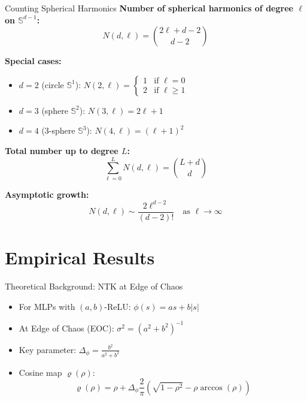 \documentclass{beamer}
\newcommand{\Sd}{\mathbb{S}^{d-1}}
\begin{document}
\begin{frame}{Counting Spherical Harmonics}
\textbf{Number of spherical harmonics of degree $\ell$ on $\Sd$:}
\[ N(d,\ell) = \binom{2\ell + d - 2}{d - 2} \]

\textbf{Special cases:}
\begin{itemize}
\item $d = 2$ (circle $\mathbb{S}^1$): $N(2,\ell) = \begin{cases} 1 & \text{if } \ell = 0 \\ 2 & \text{if } \ell \geq 1 \end{cases}$
\item $d = 3$ (sphere $\mathbb{S}^2$): $N(3,\ell) = 2\ell + 1$
\item $d = 4$ (3-sphere $\mathbb{S}^3$): $N(4,\ell) = (\ell + 1)^2$
\end{itemize}

\textbf{Total number up to degree $L$:}
\[ \sum_{\ell=0}^{L} N(d,\ell) = \binom{L + d}{d} \]

\textbf{Asymptotic growth:}
\[ N(d,\ell) \sim \frac{2\ell^{d-2}}{(d-2)!} \quad \text{as } \ell \to \infty \]
\end{frame}

\section{Empirical Results}

\begin{frame}{Theoretical Background: NTK at Edge of Chaos}
\begin{itemize}
\item For MLPs with $(a,b)$-ReLU: $\phi(s) = as + b|s|$
\item At Edge of Chaos (EOC): $\sigma^2 = (a^2+b^2)^{-1}$
\item Key parameter: $\Delta_\phi = \frac{b^2}{a^2+b^2}$
\item Cosine map $\varrho(\rho)$:
\[ \varrho(\rho) = \rho + \Delta_\phi \frac{2}{\pi}\left( \sqrt{1-\rho^2} - \rho \arccos(\rho) \right) \]
\end{itemize}
\end{frame}
\end{document}
